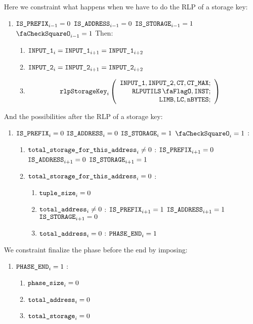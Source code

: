 \begin{enumerate}[resume]
		Here we constraint what happens when we have to do the RLP of a storage key: 
		\begin{enumerate}[resume]
			\item \If $\texttt{IS\_PREFIX}_{i-1} = 0$ \et $\texttt{IS\_ADDRESS}_{i-1} = 0$ \et $\texttt{IS\_STORAGE}_{i-1} = 1$ \et $\done_{i-1} =1$ Then:
				\begin{enumerate}
					\item $\texttt{INPUT\_1}_{i} = \texttt{INPUT\_1}_{i+1} = \texttt{INPUT\_1}_{i+2}$
					\item $\texttt{INPUT\_2}_{i} = \texttt{INPUT\_2}_{i+1} = \texttt{INPUT\_2}_{i+2}$
					\item \[
							\rlpStorageKey_{i}
							\left(
							\begin{array}{r}
								\inputColumn{1},
								\inputColumn{2},
								\ct,
								\maxCt; \\
								\rlpUtilsFlag,
								\INST; \\
								\limb,
								\lc,
								\limbsize; \\
							\end{array}
							\right)
						\]
				\end{enumerate}
		\end{enumerate}
		And the possibilities after the RLP of a storage key:
		\begin{enumerate}[resume]
			\item \If $\texttt{IS\_PREFIX}_{i} = 0$ \et $\texttt{IS\_ADDRESS}_{i} = 0$ \et $\texttt{IS\_STORAGE}_{i} = 1$ \et $\done_{i} =1$ \Then:
				\begin{enumerate}
					\item \If $\texttt{total\_storage\_for\_this\_address}_{i} \neq 0$ \Then: $\texttt{IS\_PREFIX}_{i+1} = 0$ \et $\texttt{IS\_ADDRESS}_{i+1} = 0$ \et $\texttt{IS\_STORAGE}_{i+1} = 1$
					\item \If $\texttt{total\_storage\_for\_this\_address}_{i} = 0$ \Then: 
						\begin{enumerate}
							\item $\texttt{tuple\_size}_{i} = 0$
							\item \If $\texttt{total\_address}_{i} \neq 0$ \Then: $\texttt{IS\_PREFIX}_{i+1} = 1$ \et $\texttt{IS\_ADDRESS}_{i+1} = 1$ \et $\texttt{IS\_STORAGE}_{i+1} = 0$
							\item \If $\texttt{total\_address}_{i} = 0$ \Then: $\texttt{PHASE\_END}_{i} =1$
						\end{enumerate}
				\end{enumerate}
		\end{enumerate}

		We constraint finalize the phase before the end by imposing:
		\begin{enumerate}
			\item \If $\texttt{PHASE\_END}_{i} =1$ \Then: 
				\begin{enumerate}
					\item $\texttt{phase\_size}_{i} =0$
					\item $\texttt{total\_address}_{i} =0$
					\item $\texttt{total\_storage}_{i} =0$
				\end{enumerate}
		\end{enumerate}


\end{enumerate}
